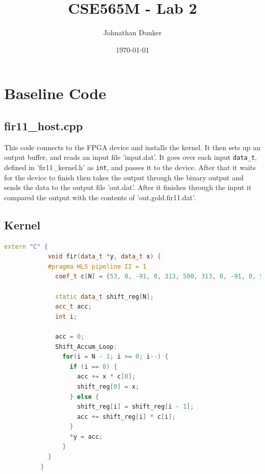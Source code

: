 \documentclass[11pt]{article}
\title{CSE565M - Lab 2}
\author{Johnathan Dunker}
\date{\today}
\begin{document}
  \maketitle

    \section{Baseline Code}
      \subsection{fir11\_host.cpp}
      This code connects to the FPGA device and installs the kernel. It then sets up an output buffer, and reads an input file 'input.dat'. It goes over each input \texttt{data\_t}, defined in 'fir11\_kernel.h' as \texttt{int}, and passes it to the device. After that it waits for the device to finish then takes the output through the binary output and sends the data to the output file 'out.dat'. After it finishes through the input it compared the output with the contents of 'out.gold.fir11.dat'.

      \pagebreak[3]
      \subsection{Kernel}
        \begin{lstlisting}[style=HLSstyle, language=C++]
          extern "C" {
            void fir(data_t *y, data_t x) {
            #pragma HLS pipeline II = 1
              coef_t c[N] = {53, 0, -91, 0, 313, 500, 313, 0, -91, 0, 53};

              static data_t shift_reg[N];
              acc_t acc;
              int i;

              acc = 0;
              Shift_Accum_Loop:
                for(i = N - 1; i >= 0; i--) {
                  if (i == 0) {
                    acc += x * c[0];
                    shift_reg[0] = x;
                  } else {
                    shift_reg[i] = shift_reg[i - 1];
                    acc += shift_reg[i] * c[i];
                  }
                  *y = acc;
                }
            }
          }
        \end{lstlisting}
      \pagebreak[3]
\end{document}
